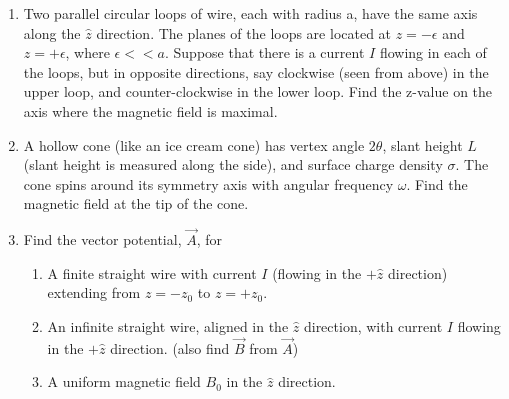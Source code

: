 \documentclass[fleqn]{article}
\begin{document}
\begin{enumerate}

    \item Two parallel circular loops of wire, each with radius a, have the same axis along the $\hat{z}$ direction. The planes of the loops 
    are located at $z=-\epsilon$ and $z=+\epsilon$, where $\epsilon << a$. Suppose that there is a current $I$ flowing in each of the loops, 
    but in opposite directions, say clockwise (seen from above) in the upper loop, and counter-clockwise in the lower loop. Find the z-value 
    on the axis where the magnetic field is maximal.


    \item A hollow cone (like an ice cream cone) has vertex angle $2\theta$, slant height $L$ (slant height is measured along the side), 
    and surface charge density $\sigma$. The cone spins around its symmetry axis with angular frequency $\omega$. Find the magnetic field at 
    the tip of the cone.


    \item Find the vector potential, $\overrightarrow{A}$, for
    \begin{enumerate}
      \item A finite straight wire with current $I$ (flowing in the $+\hat{z}$ direction)
      extending from $z=-z_0$ to $z=+z_0$.


      \item An infinite straight wire, aligned in the $\hat{z}$ direction, with current
      $I$ flowing in the $+\hat{z}$ direction. (also find $\overrightarrow{B}$ from $\overrightarrow{A}$)

      
      \item A uniform magnetic field $B_0$ in the $\hat{z}$ direction.


    \end{enumerate}



\end{enumerate}
\end{document}
